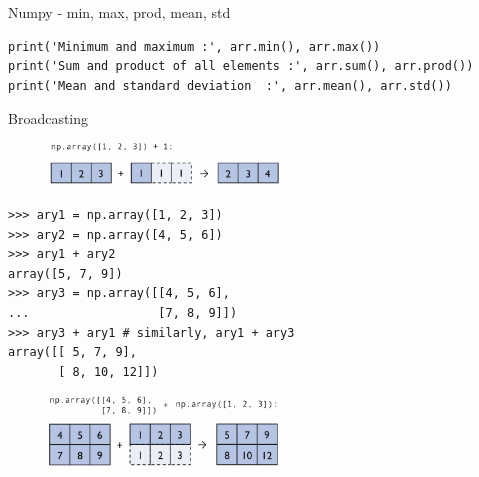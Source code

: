 \documentclass{beamer}
\begin{document}
\begin{frame}[fragile]{Numpy - min, max, prod, mean, std }

\begin{lstlisting}
print('Minimum and maximum :', arr.min(), arr.max())
print('Sum and product of all elements :', arr.sum(), arr.prod())
print('Mean and standard deviation  :', arr.mean(), arr.std())
\end{lstlisting}

\end{frame}



\begin{frame}[fragile]{Broadcasting}
\begin{figure}
    \centering
    \includegraphics[width=0.55\textwidth]{np5.png}
\end{figure}
\begin{verbatim}
>>> ary1 = np.array([1, 2, 3])
>>> ary2 = np.array([4, 5, 6])
>>> ary1 + ary2
array([5, 7, 9])
>>> ary3 = np.array([[4, 5, 6],
...                  [7, 8, 9]])
>>> ary3 + ary1 # similarly, ary1 + ary3
array([[ 5, 7, 9],
       [ 8, 10, 12]])
\end{verbatim}
\begin{figure}
    \centering
    \includegraphics[width=0.55\textwidth]{np6.png}
\end{figure}
\end{frame}
\end{document}
